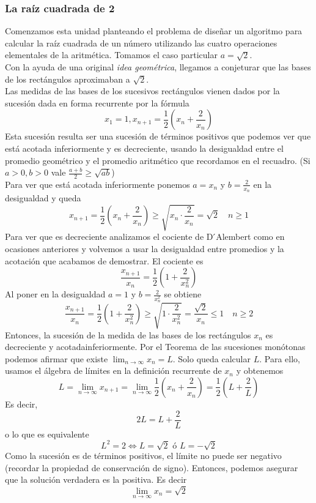 \documentclass[../Teoría.root.tex]{subfiles}
\begin{document}
\subsubsection{La raíz cuadrada de 2}
Comenzamos esta unidad planteando el problema de diseñar un algoritmo para calcular la raíz cuadrada de un número utilizando las cuatro operaciones elementales de la aritmética.
Tomamos el caso particular \(a=\sqrt{2}\).\\
Con la ayuda de una original \textit{idea geométrica}, llegamos a conjeturar que las bases de los rectángulos aproximaban a \(\sqrt{2}\).\\
Las medidas de las bases de los sucesivos rectángulos vienen dados por la sucesión dada en forma recurrente por la fórmula
\[x_1=1,x_{n+1}=\frac{1}{2}\left(x_n+\frac{2}{x_n}\right)\]
Esta sucesión resulta ser una sucesión de términos positivos que podemos ver que está acotada inferiormente y es decreciente, usando la desigualdad entre el promedio geométrico y el promedio aritmético que recordamos en el recuadro.
(Si \(a>0,b>0\) vale \(\frac{a+b}{2}\geq\sqrt{ab}\))\\
Para ver que está acotada inferiormente ponemos \(a=x_n\) y \(b=\frac{2}{x_n}\) en la desigualdad y queda
\[x_{n+1}=\frac{1}{2}\left(x_n+\frac{2}{x_n}\right)\geq\sqrt{x_n\cdot\frac{2}{x_n}}=\sqrt{2}\quad n\geq1\]
Para ver que es decreciente analizamos el cociente de D ́Alembert como en ocasiones anteriores y volvemos a usar la desigualdad entre promedios y la acotación que acabamos de demostrar.
El cociente es
\[\frac{x_{n+1}}{x_n}=\frac{1}{2}\left(1+\frac{2}{x^2_n}\right)\]
Al poner en la desigualdad \(a=1\) y \(b=\frac{2}{x^2_n}\) se obtiene
\[\frac{x_{n+1}}{x_n}=\frac{1}{2}\left(1+\frac{2}{x^2_n}\right)\geq\sqrt{1\cdot\frac{2}{x^2_n}}=\frac{\sqrt{2}}{x_n}\leq1\quad n\geq2\]
Entonces, la sucesión de la medida de las bases de los rectángulos \(x_n\) es decreciente y acotadainferiormente.
Por el Teorema de las sucesiones monótonas podemos afirmar que existe \(\lim_{n\to\infty}x_n=L\).
Solo queda calcular \(L\).
Para ello, usamos el álgebra de límites en la definición recurrente de \(x_n\) y obtenemos
\[L=\lim_{n\to\infty}x_{n+1}=\lim_{n\to\infty}\frac{1}{2}\left(x_n+\frac{2}{x_n}\right)=\frac{1}{2}\left(L+\frac{2}{L}\right)\]
Es decir,
\[2L=L+\frac{2}{L}\]
o lo que es equivalente
\[L^2=2\Longleftrightarrow L=\sqrt{2}\text{ ó }L=-\sqrt{2}\]
Como la sucesión es de términos positivos, el límite no puede ser negativo (recordar la propiedad de conservación de signo).
Entonces, podemos asegurar que la solución verdadera es la positiva.
Es decir
\[\lim_{n\to\infty}x_n=\sqrt{2}\]
\end{document}
